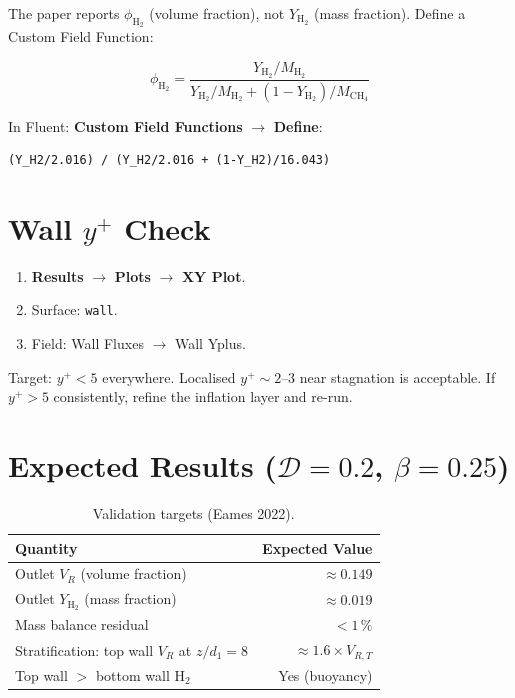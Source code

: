 \documentclass[12pt,a4paper]{report}
\begin{document}
The paper reports $\phi_{\mathrm{H}_2}$ (volume fraction), not
$Y_{\mathrm{H}_2}$ (mass fraction).  Define a Custom Field Function:

\begin{equation}
  \phi_{\mathrm{H}_2}
  = \frac{Y_{\mathrm{H}_2}/M_{\mathrm{H}_2}}
         {Y_{\mathrm{H}_2}/M_{\mathrm{H}_2}
          + (1-Y_{\mathrm{H}_2})/M_{\mathrm{CH}_4}}
\end{equation}

\noindent In Fluent: \textbf{Custom Field Functions} $\rightarrow$
\textbf{Define}:

\begin{lstlisting}[language={},numbers=none]
(Y_H2/2.016) / (Y_H2/2.016 + (1-Y_H2)/16.043)
\end{lstlisting}


\section{Wall $y^+$ Check}

\begin{enumerate}
  \item \textbf{Results} $\rightarrow$ \textbf{Plots} $\rightarrow$
        \textbf{XY Plot}.
  \item Surface: \texttt{wall}.
  \item Field: Wall Fluxes $\rightarrow$ Wall Yplus.
\end{enumerate}

\noindent Target: $y^+ < 5$ everywhere.  Localised $y^+ \sim 2$--3
near stagnation is acceptable.  If $y^+ > 5$ consistently, refine
the inflation layer and re-run.


\section{Expected Results ($\mathcal{D} = 0.2$, $\beta = 0.25$)}

\begin{table}[H]
\centering
\caption{Validation targets (Eames 2022).}
\begin{tabular}{@{}lr@{}}
\toprule
\textbf{Quantity} & \textbf{Expected Value} \\
\midrule
Outlet $V_R$ (volume fraction) & $\approx 0.149$ \\
Outlet $Y_{\mathrm{H}_2}$ (mass fraction) & $\approx 0.019$ \\
Mass balance residual & $< 1\,\%$ \\
Stratification: top wall $V_R$ at $z/d_1 = 8$ & $\approx 1.6 \times V_{R,T}$ \\
Top wall $>$ bottom wall H$_2$ & Yes (buoyancy) \\
\bottomrule
\end{tabular}
\end{table}
\end{document}
